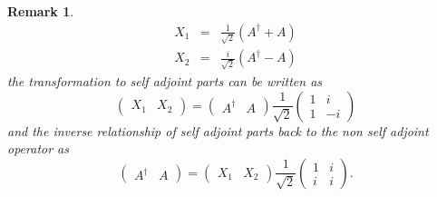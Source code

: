 \documentclass[aps,preprint]{revtex4}
\newtheorem{remark}[theorem]{Remark}
\begin{document}
\begin{remark}
\begin{eqnarray}
X_{1} &=&\frac{1}{\sqrt{2}}\left( A^{\dagger }+A\right) \\
X_{2} &=&\frac{i}{\sqrt{2}}\left( A^{\dagger }-A\right)
\end{eqnarray}%
the transformation to self adjoint parts can be written as%
\begin{equation}
\left( 
\begin{array}{cc}
X_{1} & X_{2}%
\end{array}%
\right) =\left( 
\begin{array}{cc}
A^{\dagger } & A%
\end{array}%
\right) \frac{1}{\sqrt{2}}\left( 
\begin{array}{cc}
1 & i \\ 
1 & -i%
\end{array}%
\right)
\end{equation}%
and the inverse relationship of self adjoint parts back to the non self
adjoint operator as 
\begin{equation}
\left( 
\begin{array}{cc}
A^{\dagger } & A%
\end{array}%
\right) =\left( 
\begin{array}{cc}
X_{1} & X_{2}%
\end{array}%
\right) \frac{1}{\sqrt{2}}\left( 
\begin{array}{cc}
1 & i \\ 
i & i%
\end{array}%
\right) .
\end{equation}
\end{remark}
\end{document}
